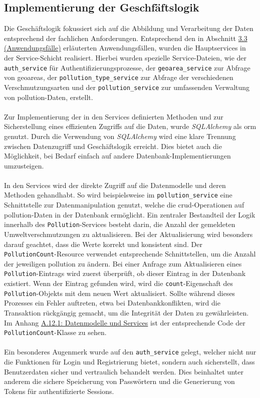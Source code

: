 \documentclass[a4paper,12pt]{article}
\begin{document}
\subsection{Implementierung der Geschfäftslogik}
Die Geschäftslogik fokussiert sich auf die Abbildung und Verarbeitung der Daten entsprechend der fachlichen Anforderungen. Entsprechend den in Abschnitt \hyperref[sec:anwendungsfälle]{3.3 (Anwendungsfälle)} erläuterten Anwendungsfällen, wurden die Hauptservices in der Service-Schicht realisiert. Hierbei wurden spezielle Service-Dateien, wie der \texttt{auth\_service} für Authentifizierungsprozesse, der \texttt{geoarea\_service} zur Abfrage von \glspl{geoarea}, der \texttt{pollution\_\-type\_\-service} zur Abfrage der verschiedenen Verschmutzungsarten und der \texttt{pollution\_service} zur umfassenden Verwaltung von \gls{pollution}-Daten, erstellt.\\
\\
Zur Implementierung der in den Services definierten Methoden und zur Sicherstellung eines effizienten Zugriffs auf die Daten, wurde \textit{SQLAlchemy} als \acrshort{orm} genutzt. Durch die Verwendung von \textit{SQLAlchemy} wird eine klare Trennung zwischen Datenzugriff und Geschäftslogik erreicht. Dies bietet auch die Möglichkeit, bei Bedarf einfach auf andere Datenbank-Implementierungen umzusteigen.\\
\\
In den Services wird der direkte Zugriff auf die Datenmodelle und deren Methoden gehandhabt. So wird beispielsweise im \texttt{pollution\_service} eine Schnittstelle zur Datenmanipulation genutzt, welche die \acrshort{crud}-Operationen auf \gls{pollution}-Daten in der Datenbank ermöglicht. Ein zentraler Bestandteil der Logik innerhalb des \texttt{Pollution}-Services besteht darin, die Anzahl der gemeldeten Umweltverschmutzungen zu aktualisieren. Bei der Aktualisierung wird besonders darauf geachtet, dass die Werte korrekt und konsistent sind. Der \texttt{PollutionCount}-Resource verwendet entsprechende Schnittstellen, um die Anzahl der jeweiligen \gls{pollution} zu ändern. Bei einer Anfrage zum Aktualisieren eines \texttt{Pollution}-Eintrags wird zuerst überprüft, ob dieser Eintrag in der Datenbank existiert. Wenn der Eintrag gefunden wird, wird die \texttt{count}-Eigenschaft des \texttt{Pollution}-Objekts mit dem neuen Wert aktualisiert. Sollte während dieses Prozesses ein Fehler auftreten, etwa bei Datenbankkonflikten, wird die Transaktion rückgängig gemacht, um die Integrität der Daten zu gewährleisten. Im Anhang \hyperref[lst:pollutionCount]{A.12.1: Datenmodelle und Services} ist der entsprechende Code der \texttt{PollutionCount}-Klasse zu sehen.\\
\\
Ein besonderes Augenmerk wurde auf den \texttt{auth\_service} gelegt, welcher nicht nur die Funktionen für Login und Registrierung bietet, sondern auch sicherstellt, dass Benutzerdaten sicher und vertraulich behandelt werden. Dies beinhaltet unter anderem die sichere Speicherung von Passwörtern und die Generierung von Tokens für authentifizierte Sessions.
\end{document}
